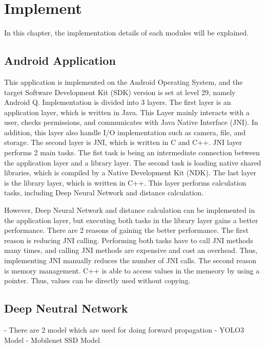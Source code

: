 \chapter{Implement}\label{implement}

    In this chapter, the implementation details of each modules will be explained.

    \section{Android Application}
        This application is implemented on the Android Operating System, and the target Software Development Kit (SDK) version is set at level 29, namely Android Q.
        Implementation is divided into 3 layers.
        The first layer is an application layer, which is written in Java.
            This Layer mainly interacts with a user, checks permissions, and communicates with Java Native Interface (JNI).
            In addition, this layer also handle I/O implementation such as camera, file, and storage.
        The second layer is JNI, which is written in C and C++.
            JNI layer performs 2 main tasks.
                The fist task is being an intermediate connection between the application layer and a library layer.
                The second task is loading native shared libraries, which is compiled by a Native Development Kit (NDK).
        The last layer is the library layer, which is written in C++.
            This layer performs calculation tasks, including Deep Neural Network and distance calculation.

        However, Deep Neural Network and distance calculation can be implemented in the application layer,
        but executing both tasks in the library layer gains a better performance. There are 2 reasons of gaining the better performance.
            The first reason is reducing JNI calling. Performing both tasks have to call JNI methods many times, and calling JNI methods are expensive and cost an overhead.
                Thus, implementing JNI manually reduces the number of JNI calls.
            The second reason is memory management. C++ is able to access values in the memeory by using a pointer.
                Thus, values can be directly used without copying.

    \section{Deep Neutral Network}
        -	There are 2 model which are used for doing forward propagation
            - YOLO3 Model
            - Mobilenet SSD Model

